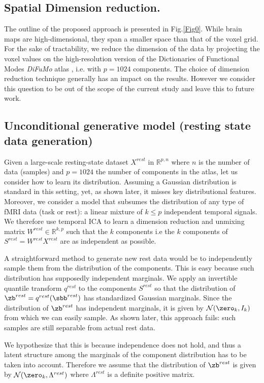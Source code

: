 \subsection{Spatial Dimension reduction.} 
The outline of the proposed approach is presented in Fig.\ref{Fig0}.
%
While brain maps are high-dimensional, they span a smaller space than that of
the voxel grid. 
%
For the sake of tractability, we reduce the dimension of the data by projecting the voxel values on the
high-resolution version of the Dictionaries of Functional Modes \emph{DiFuMo}
atlas \cite{dadi_fine-grain_2020}, i.e. with $p=1024$ components.
%
The choice of dimension reduction technique generally has an impact on the
results. However we consider this question to be out of the scope of the current study and leave this to future work.

\subsection{Unconditional generative model (resting state data generation)}
Given a large-scale resting-state dataset $X^{rest}$ in $\mathbb{R}^{p,n}$ where $n$ is the number of data (samples) and $p=1024$ the number of components in the atlas, let us consider how to learn its distribution.
%
Assuming a Gaussian distribution is standard in this setting, yet, as
shown later, it misses key distributional features.
%
Moreover, we consider a model that subsumes the distribution of any type of
fMRI data (task or rest): a linear mixture of $k \leq p$ independent temporal signals.
%
We therefore use temporal ICA to learn a dimension reduction and unmixing matrix
$W^{rest} \in \mathbb{R}^{k, p}$ such that the $k$ components i.e the $k$ components of
$S^{rest} = W^{rest} X^{rest}$ are as
independent as possible.
%
 
%

A straightforward method to generate new rest data would be to
independently sample them from the distribution of the components.
%
This is easy because such distribution has supposedly independent marginals.
We apply an invertible quantile transform $q^{rest}$ to the components $S^{rest}$ so that
the distribution of $\zb^{rest} =
q^{rest}(\sbb^{rest})$ has standardized Gaussian marginals. Since the distribution of
$\zb^{rest}$ has independent marginals, it is given by $\mathcal{N}(\zero_k, I_k)$
from which we can easily sample.
As shown later, this approach fails: such samples are still separable
from actual rest data.
%

We hypothesize that this is because independence does not hold, and
thus a latent structure among the marginals of the component distribution has to be taken into account. Therefore we assume that the distribution of $\zb^{rest}$ is given
by $\mathcal{N}(\zero_k, \Lambda^{rest})$ where $\Lambda^{rest}$ is a definite positive matrix.

